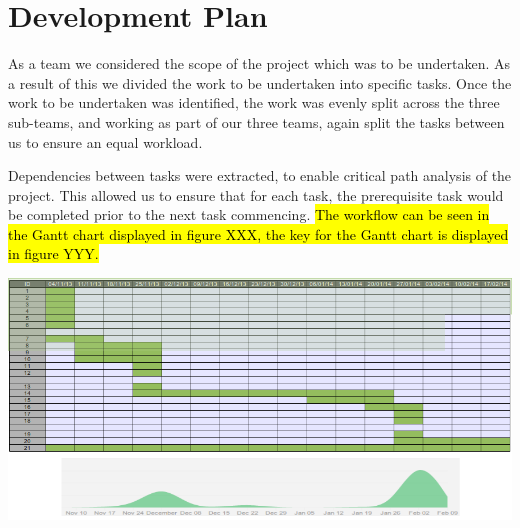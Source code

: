 \section{Development Plan}

As a team we considered the scope of the project which was to be undertaken.
 As a result of this we divided the work to be undertaken into specific tasks.
 Once the work to be undertaken was identified, the work was evenly split across 
the three sub-teams, and working as part of our three teams, again split the 
 tasks between us to ensure an equal workload.
 
Dependencies between tasks were extracted, to enable critical path analysis of the project. 
This allowed us to ensure that for each task, the prerequisite task would be completed 
prior to the next task commencing. \hl{The workflow can be seen in the Gantt chart displayed in 
figure XXX, the key for the Gantt chart is displayed in figure YYY.}

\includegraphics[scale=0.48]{images/GanttChart.png}

